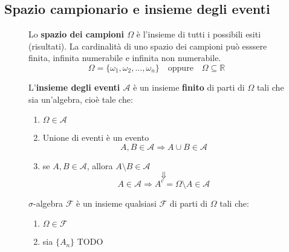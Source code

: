 \documentclass[a4paper]{article}
\theoremstyle{break}
\theoremstyle{break}
\theoremstyle{break}
\theoremstyle{break}
\begin{document}
\subsection{Spazio campionario e insieme degli eventi}
\begin{figure}[H]
  \begin{definition}
    Lo \textbf{spazio dei campioni \( \Omega \) } è l'insieme di tutti i possibili esiti 
    (risultati). La cardinalità di uno spazio dei campioni può esssere finita, infinita
    numerabile e infinita non numerabile.
    \[
    \Omega = \{\omega_1, \omega_2, \ldots, \omega_n\} \quad \text{oppure} \quad
    \Omega \subseteq \mathbb{R}
    \] 
  \end{definition}
\end{figure}
\begin{figure}[H]
  \begin{definition}
    L'\textbf{insieme degli eventi \( \mathcal{A} \) } è un insieme \textbf{finito} di
    parti di \( \Omega \) tali che sia un'algebra, cioè tale che:
    \begin{enumerate}
      \item \( \Omega \in \mathcal{A} \)
      \item Unione di eventi è un evento
        \[
          A,B \in \mathcal{A} \Rightarrow A \cup B \in \mathcal{A}
        \] 
      \item se \( A,B \in \mathcal{A} \), allora \( A \setminus B \in \mathcal{A}  \) 
        \[
        \Downarrow
        \] 
        \[
          A \in \mathcal{A} \Rightarrow A^c = \Omega \setminus A \in \mathcal{A}
        \] 
    \end{enumerate}
  \end{definition}
\end{figure}

\begin{figure}[H]
  \begin{definition}
    \( \sigma  \)-algebra \( \mathcal{F} \) è un insieme qualsiasi \( \mathcal{F} \) di
    parti di \( \Omega \) tali che:
    \begin{enumerate}
      \item \( \Omega \in \mathcal{F} \)
      \item sia \( \{A_n\}  \) 
        TODO
    \end{enumerate}
  \end{definition}
\end{figure}
\end{document}
